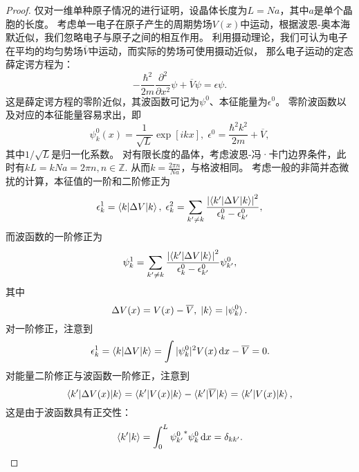\begin{proof}\small
    仅对一维单种原子情况的进行证明，设晶体长度为$L = Na$，其中$a$是单个晶胞的长度。
    考虑单一电子在原子产生的周期势场$V(x)$中运动，根据波恩-奥本海默近似，我们忽略电子与原子之间的相互作用。
    利用摄动理论，我们可认为电子在平均的均匀势场$\overline V$中运动，而实际的势场可使用摄动近似，
    那么电子运动的定态薛定谔方程为：
    \begin{equation}
        - \frac{\hbar^2}{2m} \frac{\partial^2}{\partial x^2} \psi + \overline V \psi = \epsilon \psi.
    \end{equation}
    这是薛定谔方程的零阶近似，其波函数可记为$\psi^0$、本征能量为$\epsilon^0$。
    零阶波函数以及对应的本征能量容易求出，即
    \begin{equation}
        \psi^0_k (x) = \frac{1}{\sqrt L} \exp[ikx], \; \epsilon^0 = \frac{\hbar^2 k^2}{2m} + \overline V,
    \end{equation}
    其中$1/\sqrt L$是归一化系数。
    对有限长度的晶体，考虑波恩-冯·卡门边界条件，此时有$k L = k N a = 2 \pi n, n \in \mathbb Z$.
    从而$k = \frac{2\pi n}{Na}$，与格波相同。
    考虑一般的非简并态微扰的计算，本征值的一阶和二阶修正为
    \begin{equation}
        \epsilon_k^1 = \braket{k|\Delta V|k}, \; \epsilon_k^2 = \sum_{k' \neq k} \frac{\left\vert \braket{k'|\Delta V|k} \right\vert^2}{\epsilon_k^0 - \epsilon_{k'}^0},
    \end{equation}
    而波函数的一阶修正为
    \begin{equation}
        \psi^1_k = \sum_{k' \neq k} \frac{\left\vert \braket{k'|\Delta V|k} \right\vert^2}{\epsilon_k^0 - \epsilon_{k'}^0} \psi_{k'}^0,
    \end{equation}
    其中
    \begin{equation}
        \Delta V(x) = V(x) - \overline V, \; \ket{k} = \ket{\psi_k^0}.
    \end{equation}
    对一阶修正，注意到
    \begin{equation}
        \epsilon_k^1 = \braket{k|\Delta V|k} = \int |\psi_k^0|^2 V(x) \, \mathrm d x - \overline V = 0.
    \end{equation}
    对能量二阶修正与波函数一阶修正，注意到
    \begin{equation}
        \braket{k'|\Delta V(x)|k} = \braket{k'|V(x)|k} - \braket{k'|\overline V|k} = \braket{k'|V(x)|k},
    \end{equation}
    这是由于波函数具有正交性：
    \begin{equation}
        \braket{k'|k} = \int_0^L {\psi_{k'}^0}^* \psi_k^0 \, \mathrm d x = \delta_{kk'}.

\end{equation}
\end{proof}

